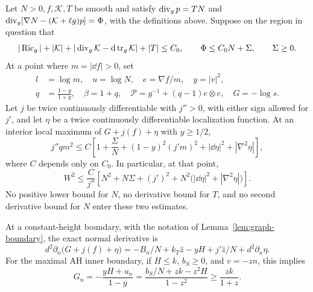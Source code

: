 \begin{lemma}\label{lem:gradient-maximum}
Let $N>0,f,\mathcal K,T$ be smooth and satisfy
$\operatorname{div}_g p=TN$ and
$\operatorname{div}_g[\nabla N-(\mathcal K+\ell g)p]=\Phi$, with the definitions
above.  Suppose on the region in question that
\begin{equation}
 |\operatorname{Ric}_g|+|\mathcal K|+
       |\operatorname{div}_g\mathcal K-\mathop{}\!\mathrm d\operatorname{tr}_g\mathcal K|+|T|\le C_0,
 \qquad \Phi\le C_0N+\Sigma,\qquad \Sigma\ge0.
 \label{eq:calculus-maximum-hypotheses}
\end{equation}
At a point where $m=|\dd f|>0$, set
\begin{equation}
 \begin{aligned}
 l&=\log m,\quad u=\log N,\quad e=\nabla f/m,\quad y=|v|^2,\\
 q&=\frac{1-y}{1+y},\quad \beta=1+q,\quad
 \mathcal P=g^{-1}+(q-1)e\otimes e,\quad G=-\log s.
 \end{aligned}
 \label{eq:calculus-gradient-notation}
\end{equation}
Let $j$ be twice continuously differentiable with $j''>0$, with either
sign allowed for $j'$, and let $\eta$ be a twice continuously
differentiable localization function.  At an interior local maximum of
$G+j(f)+\eta$ with $y\ge1/2$,
\begin{equation}
 j''q m^2\le C\left[1+\frac\Sigma N
       +(1-y)^2(j'm)^2+|\dd\eta|^2+|\nabla^2\eta|\right],
 \label{eq:calculus-gradient-maximum}
\end{equation}
where $C$ depends only on $C_0$.  In particular, at that point,
\begin{equation}
 W^2\le\frac C{j''}\left[
     N^2+N\Sigma+(j')^2
       +N^2\bigl(|\dd\eta|^2+|\nabla^2\eta|\bigr)\right].
 \label{eq:calculus-gradient-weighted}
\end{equation}
No positive lower bound for $N$, no derivative bound for $T$, and no
second derivative bound for $N$ enter these two estimates.

At a constant-height boundary, with the notation of
Lemma~\ref{lem:graph-boundary}, the exact normal derivative is
\begin{equation}
 d^2\partial_n\bigl(G+j(f)+\eta\bigr)
   =-B_n/N+k_T\hat z-yH+j'\hat z/N+d^2\partial_n\eta.
 \label{eq:calculus-gradient-boundary}
\end{equation}
For the maximal AH inner boundary, if $H\le k$, $b_S\ge0$, and
$v=-zn$, this implies
\begin{equation}
 G_n=-\frac{yH+u_n}{1-y}
       =\frac{b_S/N+zk-z^2H}{1-z^2}
       \ge\frac{zk}{1+z}.
 \label{eq:calculus-ah-gradient-boundary}
\end{equation}
\end{lemma}

